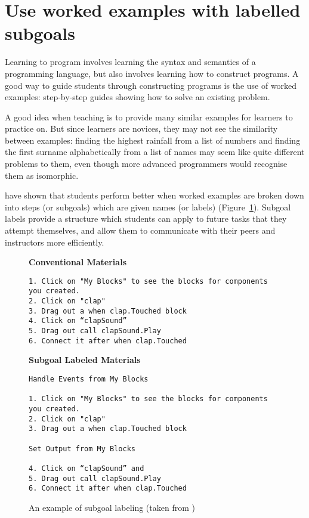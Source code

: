 \documentclass{article}
\begin{document}
\section{Use worked examples with labelled subgoals}\label{worked-examples}

Learning to program involves learning the syntax and semantics of a programming language,
but also involves learning how to construct programs.
A good way to guide students through constructing programs is the use of worked examples:
step-by-step guides showing how to solve an existing problem.

A good idea when teaching is
to provide many similar examples for learners to practice on.
But since learners are novices,
they may not see the similarity between examples:
finding the highest rainfall from a list of numbers and
finding the first surname alphabetically from a list of names
may seem like quite different problems to them,
even though more advanced programmers would recognise them as isomorphic.

\citet{morrison-subgoals,morrison-parsons,margulieux} have shown that students perform better
when worked examples are broken down into steps (or subgoals)
which are given names (or labels) (Figure~\ref{fig:subgoal}).
Subgoal labels provide a structure which students can apply to future tasks that they attempt themselves,
and allow them to communicate with their peers and instructors more efficiently.

\begin{figure}

\noindent
\textbf{Conventional Materials}
\begin{verbatim}
1. Click on "My Blocks" to see the blocks for components you created.
2. Click on "clap"
3. Drag out a when clap.Touched block
4. Click on “clapSound”
5. Drag out call clapSound.Play
6. Connect it after when clap.Touched
\end{verbatim}

\noindent
\textbf{Subgoal Labeled Materials}
\begin{verbatim}
Handle Events from My Blocks

1. Click on "My Blocks" to see the blocks for components you created.
2. Click on "clap"
3. Drag out a when clap.Touched block

Set Output from My Blocks

4. Click on “clapSound” and
5. Drag out call clapSound.Play
6. Connect it after when clap.Touched
\end{verbatim}
\label{fig:subgoal}
\caption{An example of subgoal labeling (taken from \cite{margulieux})}
\end{figure}
\end{document}
